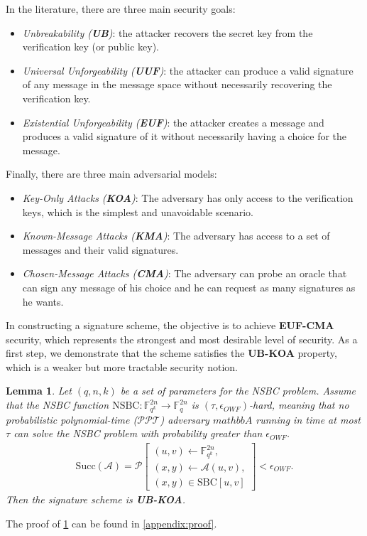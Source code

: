 \documentclass[english]{article}
\newtheorem{lemma}{Lemma}[section]
\begin{document}
		In the literature, there are three main security goals:
		\begin{itemize}
			\item \textit{Unbreakability (\textbf{UB})}: the attacker recovers the secret key from the verification key (or public key).
			\item \textit{Universal Unforgeability (\textbf{UUF})}: the attacker can produce a valid signature of any message in the message space without necessarily recovering the verification key.
			\item \textit{Existential Unforgeability (\textbf{EUF})}: the attacker creates a message and produces a valid signature of it without necessarily having a choice for the message.
		\end{itemize}
		Finally, there are three main adversarial models:
		\begin{itemize}
			\item \textit{Key-Only Attacks (\textbf{KOA})}: The adversary has only access to the verification keys, which is the simplest and unavoidable scenario.
			\item \textit{Known-Message Attacks (\textbf{KMA})}: The adversary has access to a set of messages and their valid signatures. 
			\item \textit{Chosen-Message Attacks (\textbf{CMA})}: The adversary can probe an oracle that can sign any message of his choice and he can request as many signatures as he wants.
		\end{itemize}

		In constructing a signature scheme, the objective is to achieve \textbf{EUF-CMA} security, which represents the strongest and most desirable level of security. As a first step, we demonstrate that the scheme satisfies the \textbf{UB-KOA} property, which is a weaker but more tractable security notion.
		
		\begin{lemma}\label{UB-KOA}
			Let $(q,n,k)$ be a set of parameters for the NSBC problem. Assume that the NSBC function $\text{NSBC} :\mathbb{F}_{q^k}^{2n} \rightarrow \mathbb{F}_{q}^{2n}$ is $(\tau, \epsilon_{OWF})$-hard, meaning that no probabilistic polynomial-time ($\mathcal{PPT}$) adversary $mathbb{A}$ running in time at most $\tau$ can solve the NSBC problem with probability greater than $\epsilon_{OWF}$.
			\begin{align*}
				\text{Succ}(\mathcal{A}) = \mathcal{P}\left[
				\begin{array}{l}
					(u, v) \leftarrow \mathbb{F}_{q^k}^{2n}, \\
					(x, y) \leftarrow \mathcal{A}(u, v), \\
					(x, y) \in \text{SBC}[u, v]
				\end{array}
				\right] < \epsilon_{OWF}.
			\end{align*}
			Then the signature scheme is \textbf{UB-KOA}.
		\end{lemma}
		The proof of \ref{UB-KOA} can be found in \ref{appendix:proof}.
		
\end{document}
